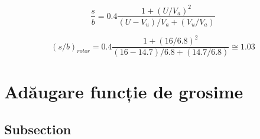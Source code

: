 \begin{equation}
\frac{s}{b} = 0.4 \frac{1 + (U / V_a)^2 } {(U - V_u) / V_a + (V_u / V_a)}
\end{equation}

\begin{equation}
(s/b)_{rotor} = 0.4 \frac{1 + (16 / 6.8)^2 } {(16 - 14.7) / 6.8 + (14.7 / 6.8)} \cong 1.03
\end{equation}

\clearpage


\section{Adăugare funcție de grosime}

\subsection{Subsection}